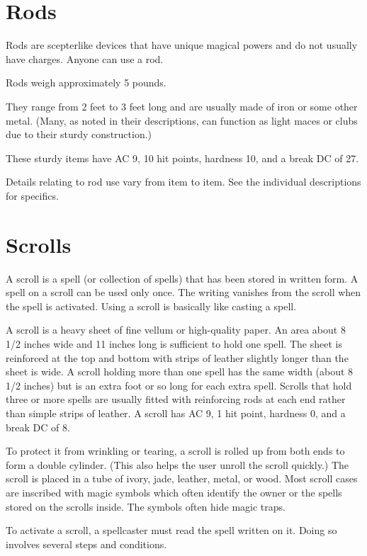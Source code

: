 \section{Rods}

Rods are scepterlike devices that have unique magical powers and do not usually have charges. Anyone can use a rod.

 Rods weigh approximately 5 pounds.

They range from 2 feet to 3 feet long and are usually made of iron or some other metal. (Many, as noted in their descriptions, can function as light maces or clubs due to their sturdy construction.)

These sturdy items have AC 9, 10 hit points, hardness 10, and a break DC of 27.

 Details relating to rod use vary from item to item. See the individual descriptions for specifics.

\section{Scrolls}
A scroll is a spell (or collection of spells) that has been stored in written form. A spell on a scroll can be used only once. The writing vanishes from the scroll when the spell is activated. Using a scroll is basically like casting a spell.

 A scroll is a heavy sheet of fine vellum or high-quality paper. An area about 8 1/2 inches wide and 11 inches long is sufficient to hold one spell. The sheet is reinforced at the top and bottom with strips of leather slightly longer than the sheet is wide. A scroll holding more than one spell has the same width (about 8 1/2 inches) but is an extra foot or so long for each extra spell. Scrolls that hold three or more spells are usually fitted with reinforcing rods at each end rather than simple strips of leather. A scroll has AC 9, 1 hit point, hardness 0, and a break DC of 8.

To protect it from wrinkling or tearing, a scroll is rolled up from both ends to form a double cylinder. (This also helps the user unroll the scroll quickly.) The scroll is placed in a tube of ivory, jade, leather, metal, or wood. Most scroll cases are inscribed with magic symbols which often identify the owner or the spells stored on the scrolls inside. The symbols often hide magic traps.

 To activate a scroll, a spellcaster must read the spell written on it. Doing so involves several steps and conditions.

